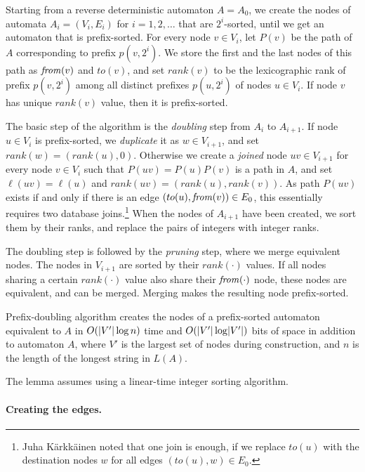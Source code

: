 Starting from a reverse deterministic automaton $A = A_{0}$, we create the nodes of automata $A_{i} = (V_{i}, E_{i})$ for $i = 1, 2, \dotsc$ that are $2^{i}$\nobreakdash-sorted, until we get an automaton that is prefix-sorted. For every node $v \in V_{i}$, let $P(v)$ be the path of $A$ corresponding to prefix $p(v, 2^{i})$. We store the first and the last nodes of this path as $\mathit{from}(v)$ and $to(v)$, and set $rank(v)$ to be the lexicographic rank of prefix $p(v, 2^{i})$ among all distinct prefixes $p(u, 2^{i})$ of nodes $u \in V_{i}$. If node $v$ has unique $rank(v)$ value, then it is prefix-sorted.

The basic step of the algorithm is the {\em doubling} step from $A_{i}$ to $A_{i+1}$. If node $u \in V_{i}$ is prefix-sorted, we {\em duplicate} it as $w \in V_{i+1}$, and set $rank(w) = (rank(u), 0)$. Otherwise we create a {\em joined} node $uv \in V_{i+1}$ for every node $v \in V_{i}$ such that $P(uv) = P(u)P(v)$ is a path in $A$, and set $\ell(uv) = \ell(u)$ and $rank(uv) = (rank(u), rank(v))$. As path $P(uv)$ exists if and only if there is an edge $(to(u), \mathit{from}(v)) \in E_{0}$, this essentially requires two database joins.\footnote{Juha Kärkkäinen noted that one join is enough, if we replace $to(u)$ with the destination nodes $w$ for all edges $(to(u), w) \in E_{0}$.} When the nodes of $A_{i+1}$ have been created, we sort them by their ranks, and replace the pairs of integers with integer ranks.

The doubling step is followed by the {\em pruning} step, where we merge equivalent nodes. The nodes in $V_{i+1}$ are sorted by their $rank(\cdot)$ values. If all nodes sharing a certain $rank(\cdot)$ value also share their $\mathit{from}(\cdot)$ node, these nodes are equivalent, and can be merged. Merging makes the resulting node prefix-sorted.

\begin{lemma}\label{lemma:node construction}
Prefix-doubling algorithm creates the nodes of a prefix-sorted automaton equivalent to $A$ in $O(\lvert V' \rvert \log n)$ time and $O(\lvert V' \rvert \log \lvert V' \rvert)$ bits of space in addition to automaton $A$, where $V'$ is the largest set of nodes during construction, and $n$ is the length of the longest string in $L(A)$.
\end{lemma}

The lemma assumes using a linear-time integer sorting algorithm.

\paragraph{Creating the edges.}

